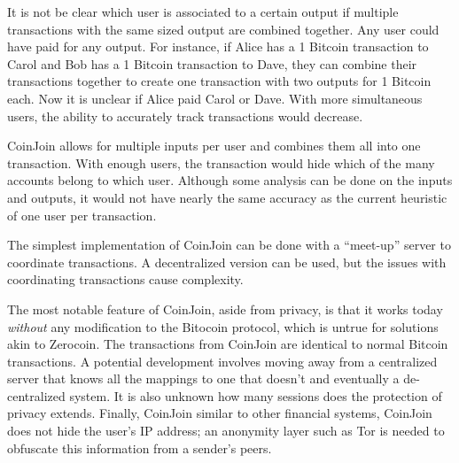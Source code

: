 It is not be clear which user is associated to a certain output if multiple transactions with the same sized output are combined together. Any user could have paid for any output. For instance, if Alice has a 1 Bitcoin transaction to Carol and Bob has a 1 Bitcoin transaction to Dave, they can combine their transactions together to create one transaction with two outputs for 1 Bitcoin each. Now it is unclear if Alice paid Carol or Dave. With more simultaneous users, the ability to accurately track transactions would decrease.

CoinJoin allows for multiple inputs per user and combines them all into one transaction. With enough users, the transaction would hide which of the many accounts belong to which user. Although some analysis can be done on the inputs and outputs, it would not have nearly the same accuracy as the current heuristic of one user per transaction.

The simplest implementation of CoinJoin can be done with a ``meet-up'' server to coordinate transactions. A decentralized version can be used, but the issues with coordinating transactions cause complexity.

The most notable feature of CoinJoin, aside from privacy, is that it works today \emph{without} any modification to the Bitocoin protocol, which is untrue for solutions akin to Zerocoin. The transactions from CoinJoin are identical to normal Bitcoin transactions. A potential development involves moving away from a centralized server that knows all the mappings to one that doesn't and eventually a de-centralized system. It is also unknown how many sessions does the protection of privacy extends. Finally, CoinJoin similar to other financial systems, CoinJoin does not hide the user's IP address; an anonymity layer such as Tor is needed to obfuscate this information from a sender's peers.





